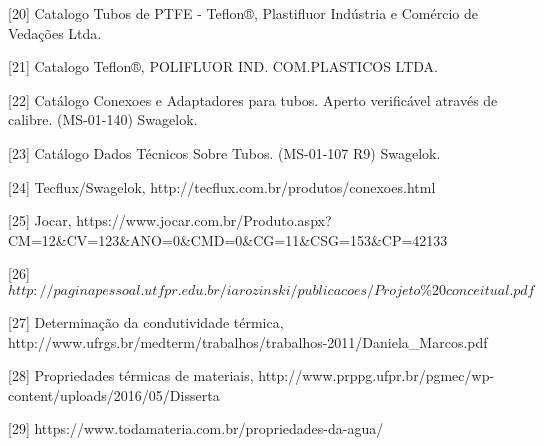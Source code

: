 [20] Catalogo Tubos de PTFE - Teflon®, Plastifluor Indústria e Comércio de Vedações Ltda.

[21] Catalogo Teflon®, POLIFLUOR IND. COM.PLASTICOS LTDA. 

[22] Catálogo Conexoes e Adaptadores para tubos. Aperto verificável através de calibre. (MS-01-140) Swagelok.

[23] Catálogo Dados Técnicos Sobre Tubos. (MS-01-107 R9) Swagelok.

[24] Tecflux/Swagelok, http://tecflux.com.br/produtos/conexoes.html

[25] Jocar, https://www.jocar.com.br/Produto.aspx?CM=12\&CV=123\&ANO=0\&CMD=0\&CG=11\&CSG=153\&CP=42133

[26] $http://paginapessoal.utfpr.edu.br/iarozinski/publicacoes/Projeto\%20conceitual.pdf$

[27] Determinação da condutividade térmica, http://www.ufrgs.br/medterm/trabalhos/trabalhos-2011/Daniela_Marcos.pdf

[28] Propriedades térmicas de materiais, http://www.prppg.ufpr.br/pgmec/wp-content/uploads/2016/05/Disserta%

[29] https://www.todamateria.com.br/propriedades-da-agua/
